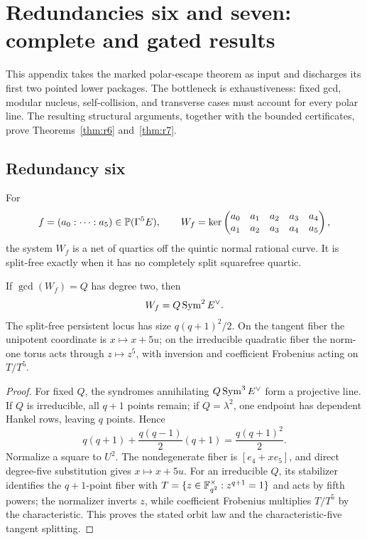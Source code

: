 \section{Redundancies six and seven: complete and gated results}
\label{sec:r67}

This appendix takes the marked polar-escape theorem as input and discharges
its first two pointed lower packages.  The bottleneck is exhaustiveness:
fixed gcd, modular nucleus, self-collision, and transverse cases must account
for every polar line.  The resulting structural arguments, together with the
bounded certificates, prove Theorems~\ref{thm:r6} and~\ref{thm:r7}.

\subsection{Redundancy six}

For
\[
 f=(a_0:\cdots:a_5)\in\mathbb P(\Gamma^5E),\qquad
 W_f=\ker
 \begin{pmatrix}
 a_0&a_1&a_2&a_3&a_4\\
 a_1&a_2&a_3&a_4&a_5
 \end{pmatrix},
\]
the system $W_f$ is a net of quartics off the quintic normal rational
curve.  It is split-free exactly when it has no completely split
squarefree quartic.

\begin{proposition}\label{prop:r6-persistent}%
%
%
If $\gcd(W_f)=Q$ has degree two, then
\[
       W_f=Q\operatorname{Sym}^2E^\vee.
\]
The split-free persistent locus has size $q(q+1)^2/2$.  On the tangent fiber
the unipotent coordinate is $x\mapsto x+5u$; on the irreducible
quadratic fiber the norm-one torus acts through $z\mapsto z^5$, with
inversion and coefficient Frobenius acting on $T/T^5$.
\end{proposition}

\begin{proof}
For fixed $Q$, the syndromes annihilating
$Q\operatorname{Sym}^3E^\vee$ form a projective line.  If $Q$ is irreducible, all
$q+1$ points remain; if $Q=\lambda^2$, one endpoint has dependent
Hankel rows, leaving $q$ points.  Hence
\[
 q(q+1)+\frac{q(q-1)}2(q+1)=\frac{q(q+1)^2}{2}.
\]
Normalize a square to $U^2$.  The nondegenerate fiber is
$[e_4+xe_5]$, and direct degree-five substitution gives
$x\mapsto x+5u$.  For an irreducible $Q$, its stabilizer identifies
the $q+1$-point fiber with
$T=\{z\in\mathbb F_{q^2}^\times:z^{q+1}=1\}$ and acts by fifth powers; the
normalizer inverts $z$, while coefficient Frobenius multiplies
$T/T^5$ by the characteristic.  This proves the stated orbit law and
the characteristic-five tangent splitting.
\end{proof}

